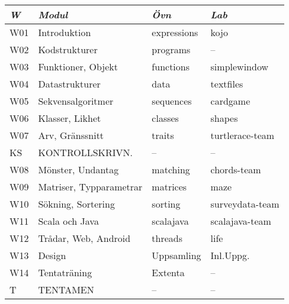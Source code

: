 \begin{tabular}{l|l|l|l}
\textit{W} & \textit{Modul} & \textit{Övn} & \textit{Lab} \\ \hline \hline
W01 & Introduktion            & expressions & kojo            \\
W02 & Kodstrukturer           & programs    & --              \\
W03 & Funktioner, Objekt      & functions   & simplewindow    \\
W04 & Datastrukturer          & data        & textfiles       \\
W05 & Sekvensalgoritmer       & sequences   & cardgame        \\
W06 & Klasser, Likhet         & classes     & shapes          \\
W07 & Arv, Gränssnitt         & traits      & turtlerace-team \\
KS  & KONTROLLSKRIVN.         & --          & --              \\
W08 & Mönster, Undantag       & matching    & chords-team     \\
W09 & Matriser, Typparametrar & matrices    & maze            \\
W10 & Sökning, Sortering      & sorting     & surveydata-team \\
W11 & Scala och Java          & scalajava   & scalajava-team  \\
W12 & Trådar, Web, Android    & threads     & life            \\
W13 & Design                  & Uppsamling  & Inl.Uppg.       \\
W14 & Tentaträning            & Extenta     & --              \\
T   & TENTAMEN                & --          & --              \\
\end{tabular}
